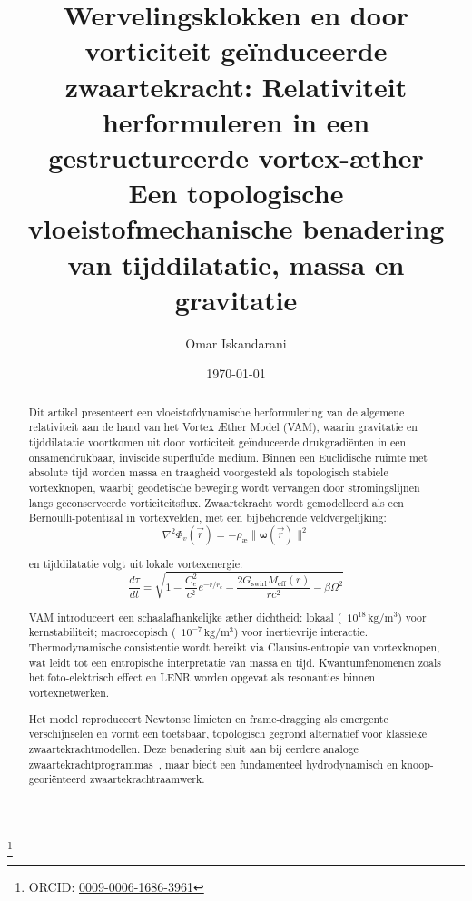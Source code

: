 \documentclass[a4paper, aps,preprint,superscriptaddress, 12pt]{revtex4}
\begin{document}
    \author{Omar Iskandarani}
    \title{
        Wervelingsklokken en door vorticiteit geïnduceerde zwaartekracht:
        Relativiteit herformuleren in een gestructureerde vortex-æther\\
        \textnormal{\normalsize Een topologische vloeistofmechanische benadering van tijddilatatie, massa en gravitatie}
    }

    \date{\today}
    \thanks{ORCID: \href{https://orcid.org/0009-0006-1686-3961}{0009-0006-1686-3961}}


    \begin{abstract}
        Dit artikel presenteert een vloeistofdynamische herformulering van de algemene relativiteit aan de hand van het Vortex Æther Model (VAM), waarin gravitatie en tijddilatatie voortkomen uit door vorticiteit geïnduceerde drukgradiënten in een onsamendrukbaar, inviscide superfluïde medium. Binnen een Euclidische ruimte met absolute tijd worden massa en traagheid voorgesteld als topologisch stabiele vortexknopen, waarbij geodetische beweging wordt vervangen door stromingslijnen langs geconserveerde vorticiteitsflux.
        Zwaartekracht wordt gemodelleerd als een Bernoulli-potentiaal in vortexvelden, met een bijbehorende veldvergelijking:
        \begin{equation*}
            \nabla^2 \Phi_v(\vec{r}) = -\rho_\text{\ae} \|\boldsymbol{\omega}(\vec{r})\|^2
        \end{equation*}

        en tijddilatatie volgt uit lokale vortexenergie:
        \begin{equation*}
            \frac{d\tau}{dt} = \sqrt{1 - \frac{C_e^2}{c^2} e^{-r/r_c} - \frac{2G_\text{swirl} M_\text{eff}(r)}{rc^2} - \beta \Omega^2}
        \end{equation*}

        VAM introduceert een schaalafhankelijke æther dichtheid: lokaal (~$10^{18}\,\mathrm{kg/m^3}$) voor kernstabiliteit; macroscopisch (~$10^{-7}\,\mathrm{kg/m^3}$) voor inertievrije interactie. Thermodynamische consistentie wordt bereikt via Clausius-entropie van vortexknopen, wat leidt tot een entropische interpretatie van massa en tijd. Kwantumfenomenen zoals het foto-elektrisch effect en LENR worden opgevat als resonanties binnen vortexnetwerken.

        Het model reproduceert Newtonse limieten en frame-dragging als emergente verschijnselen en vormt een toetsbaar, topologisch gegrond alternatief voor klassieke zwaartekrachtmodellen. Deze benadering sluit aan bij eerdere analoge zwaartekrachtprogramma\rqs s~\cite{barcelo2011analogue,volovik2009universe}, maar biedt een fundamenteel hydrodynamisch en knoop-georiënteerd zwaartekrachtraamwerk.
    \end{abstract}
\end{document}

